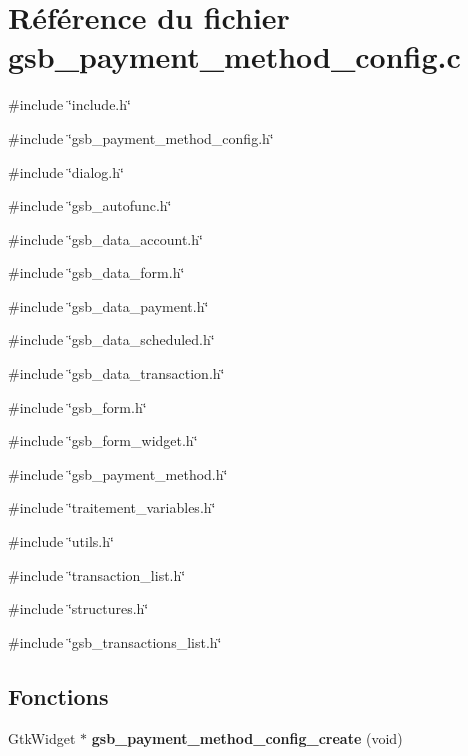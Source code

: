 \section{Référence du fichier gsb\_\-payment\_\-method\_\-config.c}
\label{gsb__payment__method__config_8c}
{\ttfamily \#include \char`\"{}include.h\char`\"{}}\par
{\ttfamily \#include \char`\"{}gsb\_\-payment\_\-method\_\-config.h\char`\"{}}\par
{\ttfamily \#include \char`\"{}dialog.h\char`\"{}}\par
{\ttfamily \#include \char`\"{}gsb\_\-autofunc.h\char`\"{}}\par
{\ttfamily \#include \char`\"{}gsb\_\-data\_\-account.h\char`\"{}}\par
{\ttfamily \#include \char`\"{}gsb\_\-data\_\-form.h\char`\"{}}\par
{\ttfamily \#include \char`\"{}gsb\_\-data\_\-payment.h\char`\"{}}\par
{\ttfamily \#include \char`\"{}gsb\_\-data\_\-scheduled.h\char`\"{}}\par
{\ttfamily \#include \char`\"{}gsb\_\-data\_\-transaction.h\char`\"{}}\par
{\ttfamily \#include \char`\"{}gsb\_\-form.h\char`\"{}}\par
{\ttfamily \#include \char`\"{}gsb\_\-form\_\-widget.h\char`\"{}}\par
{\ttfamily \#include \char`\"{}gsb\_\-payment\_\-method.h\char`\"{}}\par
{\ttfamily \#include \char`\"{}traitement\_\-variables.h\char`\"{}}\par
{\ttfamily \#include \char`\"{}utils.h\char`\"{}}\par
{\ttfamily \#include \char`\"{}transaction\_\-list.h\char`\"{}}\par
{\ttfamily \#include \char`\"{}structures.h\char`\"{}}\par
{\ttfamily \#include \char`\"{}gsb\_\-transactions\_\-list.h\char`\"{}}\par
\subsection*{Fonctions}
\begin{DoxyCompactItemize}
\item 
GtkWidget $\ast$ {\bf gsb\_\-payment\_\-method\_\-config\_\-create} (void)
\end{DoxyCompactItemize}
